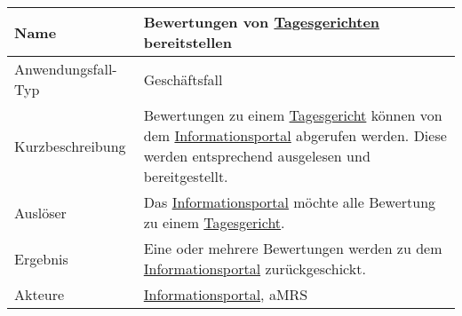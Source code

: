 \begin{table}[H]
    \centering
    \label{bewertungenbereitstellen}
    \begin{tabularx}{\textwidth}{| l | X |}
        \hline
        Name               & Bewertungen von \hyperref[gls:tagesgericht]{Tagesgerichten} bereitstellen                                                                                                                                      \\
        \hline
        Anwendungsfall-Typ & Geschäftsfall                                                                                                                                                                                                  \\
        \hline
        Kurzbeschreibung   & Bewertungen zu einem \hyperref[gls:tagesgericht]{Tagesgericht} können von dem \hyperref[gls:informationsportal]{Informationsportal} abgerufen werden. Diese werden entsprechend ausgelesen und bereitgestellt. \\
        \hline
        Auslöser           & Das \hyperref[gls:informationsportal]{Informationsportal} möchte alle Bewertung zu einem \hyperref[gls:tagesgericht]{Tagesgericht}.                                                                            \\
        \hline
        Ergebnis           & Eine oder mehrere Bewertungen werden zu dem \hyperref[gls:informationsportal]{Informationsportal} zurückgeschickt.                                                                                             \\
        \hline
        Akteure            & \hyperref[gls:informationsportal]{Informationsportal}, \ac{aMRS}                                                                                                                                               \\
        \hline
    \end{tabularx}
\end{table}

